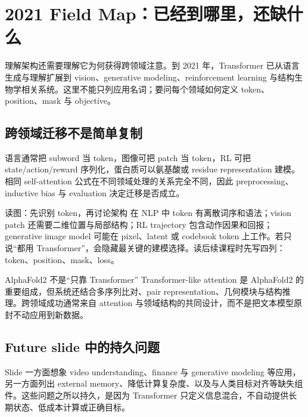 \section{2021 Field Map：已经到哪里，还缺什么}

理解架构还需要理解它为何获得跨领域注意。到 2021 年，Transformer 已从语言生成与理解扩展到 vision、generative modeling、reinforcement learning 与结构生物学相关系统。这里不能只列应用名词；要问每个领域如何定义 token、position、mask 与 objective。

\subsection{跨领域迁移不是简单复制}

语言通常把 subword 当 token，图像可把 patch 当 token，RL 可把 state/action/reward 序列化，蛋白质可以氨基酸或 residue representation 建模。相同 self-attention 公式在不同领域处理的关系完全不同，因此 preprocessing、inductive bias 与 evaluation 决定迁移是否成立。


\begin{knowledgebox}{读图：先识别 token，再讨论架构}
在 NLP 中 token 有离散词序和语法；vision patch 还需要二维位置与局部结构；RL trajectory 包含动作因果和回报；generative image model 可能在 pixel、latent 或 codebook token 上工作。若只说“都用 Transformer”，会隐藏最关键的建模选择。读后续课程时先写四列：token、position、mask、loss。
\end{knowledgebox}

\begin{warningbox}{AlphaFold2 不是“只靠 Transformer”}
Transformer-like attention 是 AlphaFold2 的重要组成，但系统还结合多序列比对、pair representation、几何模块与结构推理。跨领域成功通常来自 attention 与领域结构的共同设计，而不是把文本模型原封不动应用到新数据。
\end{warningbox}

\subsection{Future slide 中的持久问题}

Slide 一方面想象 video understanding、finance 与 generative modeling 等应用，另一方面列出 external memory、降低计算复杂度、以及与人类目标对齐等缺失组件。这些问题之所以持久，是因为 Transformer 只定义信息混合，不自动提供长期状态、低成本计算或正确目标。


